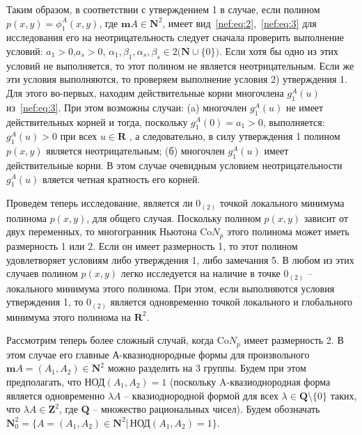 Таким образом, в соответствии с утверждением 1 в случае, если полином $p(x,y)=\phi^A_1(x,y)$, где $\mathbf{m}A\in\mathbf{N}^2$, имеет вид~\eqref{nef:eq:2},~\eqref{nef:eq:3} для исследования его на неотрицательность следует сначала проверить выполнение условий: $a_1>0$,$a_s>0$, $\alpha_1,\beta_1,\alpha_s,\beta_s\in2\big(\mathbf{N}\cup\{0\}\big)$. Если хотя бы одно из этих условий не выполняется, то этот полином не является неотрицательным. Если же эти условия выполняются, то проверяем выполнение условия 2) утверждения 1. Для этого во-первых, находим действительные корни  многочлена $g^A_1(u)$ из~\eqref{nef:eq:3}. При этом возможны случаи:\newline
\indent (a) многочлен $g^A_1(u)$  не имеет действительных корней и тогда, поскольку $g^A_1(0)=a_1>0$, выполняется: $g^A_1(u)>0$ при всех $u\in\mathbf{R}$ , а следовательно, в силу утверждения 1 полином $p(x,y)$ является неотрицательным;\newline
\indent (б) многочлен $g^A_1(u)$ имеет действительные корни. В этом случае очевидным условием неотрицательности $g^A_1(u)$
вляется четная кратность его корней.

Проведем теперь исследование, является ли $0_{(2)}$ точкой локального минимума полинома $p(x,y)$, для общего случая. Поскольку полином $p(x,y)$ зависит от двух переменных, то многогранник Ньютона $\text{Co}N_p$ этого полинома может иметь размерность 1 или 2. Если он имеет размерность 1, то этот полином удовлетворяет условиям либо утверждения 1, либо замечания 5. В любом из этих случаев полином $p(x,y)$ легко исследуется на наличие в точке $0_{(2)}$  –  локального минимума этого полинома. При этом, если выполняются условия утверждения 1, то $0_{(2)}$ является одновременно точкой локального и глобального минимума этого полинома на $\mathbf{R}^2$.

Рассмотрим теперь более сложный случай, когда $\text{Co}N_p$  имеет размерность 2. В этом случае его главные А-квазиоднородные формы для произвольного $\mathbf{m}A=(A_1,A_2)\in\mathbf{N}^2$ можно разделить на 3 группы. Будем при этом предполагать, что $\text{НОД}(A_1,A_2)=1$ (поскольку A-квазиоднородная форма является одновременно $\lambda A$ – квазиоднородной формой для всех $\lambda\in\mathbf{Q}\setminus\{0\}$ таких, что $\lambda A\in\mathbf{Z}^2$, где $\mathbf{Q}$ – множество рациональных чисел).
\newline Будем обозначать $\mathbf{N}^2_0=\big\{A=(A_1,A_2)\in\mathbf{N}^2\big|\,\text{НОД}(A_1,A_2)=1 \big\}$.

